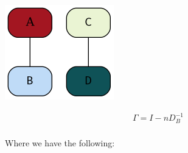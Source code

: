 \documentclass[11pt]{article}
\begin{document}
\begin{center}
\includegraphics[width=.9\linewidth]{./Media/Example.png}
\end{center}



$$\begin{aligned}
    \Gamma =  I - n D^{- 1}_B \\
\end{aligned}$$

Where we have the following:
\end{document}
